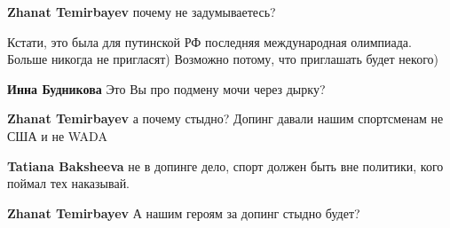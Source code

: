 \begin{itemize}
\begin{itemize}
 
\textbf{Zhanat Temirbayev} почему не задумываетесь?

 
Кстати, это была для путинской РФ последняя международная олимпиада.
Больше никогда не пригласят)
Возможно потому, что приглашать будет некого)

 
\textbf{Инна Будникова} Это Вы про подмену мочи через дырку?

 
\textbf{Zhanat Temirbayev} а почему стыдно? Допинг давали нашим спортсменам не США и не WADA

 
\textbf{Tatiana Baksheeva} не в допинге дело, спорт должен быть вне политики, кого поймал тех наказывай.

 
\textbf{Zhanat Temirbayev} А нашим героям за допинг стыдно будет?

 

\end{itemize}
\end{itemize}

